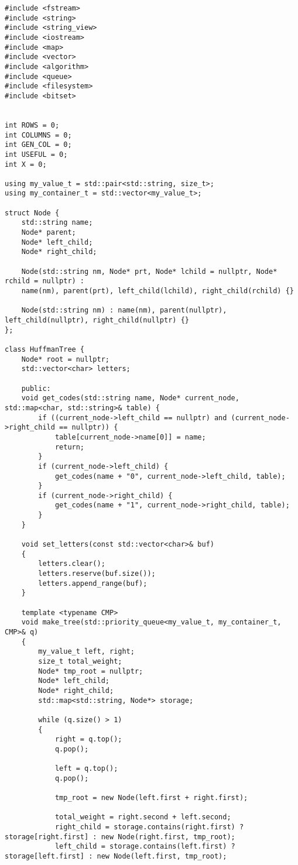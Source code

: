 \begin{lstlisting}[label = list1, caption = Программная реализация описанных алгоритмов]
#include <fstream>
#include <string>
#include <string_view>
#include <iostream>
#include <map>
#include <vector>
#include <algorithm>
#include <queue>
#include <filesystem>
#include <bitset>


int ROWS = 0;
int COLUMNS = 0;
int GEN_COL = 0;
int USEFUL = 0;
int X = 0;

using my_value_t = std::pair<std::string, size_t>;
using my_container_t = std::vector<my_value_t>;

struct Node {
	std::string name;
	Node* parent;
	Node* left_child;
	Node* right_child;
	
	Node(std::string nm, Node* prt, Node* lchild = nullptr, Node* rchild = nullptr) :
	name(nm), parent(prt), left_child(lchild), right_child(rchild) {}
	
	Node(std::string nm) : name(nm), parent(nullptr), left_child(nullptr), right_child(nullptr) {}
};

class HuffmanTree {
	Node* root = nullptr;
	std::vector<char> letters;
	
	public:
	void get_codes(std::string name, Node* current_node, std::map<char, std::string>& table) {
		if ((current_node->left_child == nullptr) and (current_node->right_child == nullptr)) {
			table[current_node->name[0]] = name;
			return;
		}
		if (current_node->left_child) {
			get_codes(name + "0", current_node->left_child, table);
		}
		if (current_node->right_child) {
			get_codes(name + "1", current_node->right_child, table);
		}
	}
	
	void set_letters(const std::vector<char>& buf) 
	{
		letters.clear();
		letters.reserve(buf.size());
		letters.append_range(buf);
	}
	
	template <typename CMP>
	void make_tree(std::priority_queue<my_value_t, my_container_t, CMP>& q)
	{
		my_value_t left, right;
		size_t total_weight;
		Node* tmp_root = nullptr;
		Node* left_child;
		Node* right_child;
		std::map<std::string, Node*> storage;
		
		while (q.size() > 1)
		{			
			right = q.top();
			q.pop();
			
			left = q.top();
			q.pop();
			
			tmp_root = new Node(left.first + right.first);
			
			total_weight = right.second + left.second;
			right_child = storage.contains(right.first) ? storage[right.first] : new Node(right.first, tmp_root);
			left_child = storage.contains(left.first) ? storage[left.first] : new Node(left.first, tmp_root);
			

\end{lstlisting}
